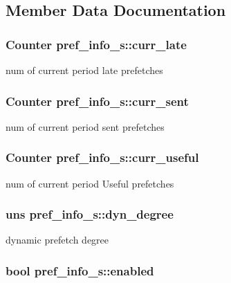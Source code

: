 \subsection{Member Data Documentation}
\hypertarget{structpref__info__s_ad21578ee3356e797bd0ebb5b3e61cbf5}{
\subsubsection[{curr\_\-late}]{\setlength{\rightskip}{0pt plus 5cm}Counter {\bf pref\_\-info\_\-s::curr\_\-late}}}
\label{structpref__info__s_ad21578ee3356e797bd0ebb5b3e61cbf5}
num of current period late prefetches \hypertarget{structpref__info__s_abc0afd16ea57472bdc0f79079cd3dc40}{
\subsubsection[{curr\_\-sent}]{\setlength{\rightskip}{0pt plus 5cm}Counter {\bf pref\_\-info\_\-s::curr\_\-sent}}}
\label{structpref__info__s_abc0afd16ea57472bdc0f79079cd3dc40}
num of current period sent prefetches \hypertarget{structpref__info__s_ab196c66d3acfbe4309c4a6cc8fc565d5}{
\subsubsection[{curr\_\-useful}]{\setlength{\rightskip}{0pt plus 5cm}Counter {\bf pref\_\-info\_\-s::curr\_\-useful}}}
\label{structpref__info__s_ab196c66d3acfbe4309c4a6cc8fc565d5}
num of current period Useful prefetches \hypertarget{structpref__info__s_a99fd5a2733a16f8e4c89a91a87d219da}{
\subsubsection[{dyn\_\-degree}]{\setlength{\rightskip}{0pt plus 5cm}uns {\bf pref\_\-info\_\-s::dyn\_\-degree}}}
\label{structpref__info__s_a99fd5a2733a16f8e4c89a91a87d219da}
dynamic prefetch degree \hypertarget{structpref__info__s_a76baaa162c64c556fad1f2f07cc11767}{
\subsubsection[{enabled}]{\setlength{\rightskip}{0pt plus 5cm}bool {\bf pref\_\-info\_\-s::enabled}}}
